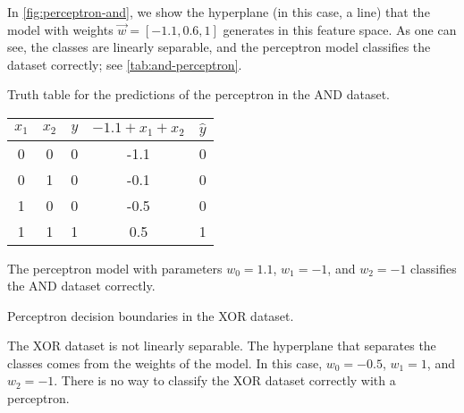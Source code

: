 In \cref{fig:perceptron-and}, we show the hyperplane (in this case, a line) that the model
with weights $\vec{w} = [-1.1, 0.6, 1]$ generates in this feature space.
As one can see, the classes are linearly separable, and the perceptron model classifies
the dataset correctly; see \cref{tab:and-perceptron}.

\begin{tablebox}[label=tab:and-perceptron]{Truth table for the predictions of the perceptron in the AND dataset.}
  \centering
  \begin{tabular}{ccc|cc}
    \toprule
    $x_1$ & $x_2$ & $y$ & $-1.1 + x_1 + x_2$ & $\hat{y}$ \\
    \midrule
    0 & 0 & 0 & -1.1 & 0 \\
    0 & 1 & 0 & -0.1 & 0 \\
    1 & 0 & 0 & -0.5 & 0 \\
    1 & 1 & 1 & 0.5 & 1 \\
    \bottomrule
  \end{tabular}
  \tcblower
  The perceptron model with parameters $w_0 = 1.1$, $w_1 = -1$, and $w_2 = -1$
  classifies the AND dataset correctly.
\end{tablebox}

\begin{figurebox}[label=fig:perceptron-xor]{Perceptron decision boundaries in the XOR
  dataset.}
  \centering
  \tcblower
  The XOR dataset is not linearly separable.
  The hyperplane that separates the classes comes from the weights of the model.
  In this case, $w_0 = -0.5$, $w_1 = 1$, and $w_2 = -1$.
  There is no way to classify the XOR dataset correctly with a perceptron.
\end{figurebox}

